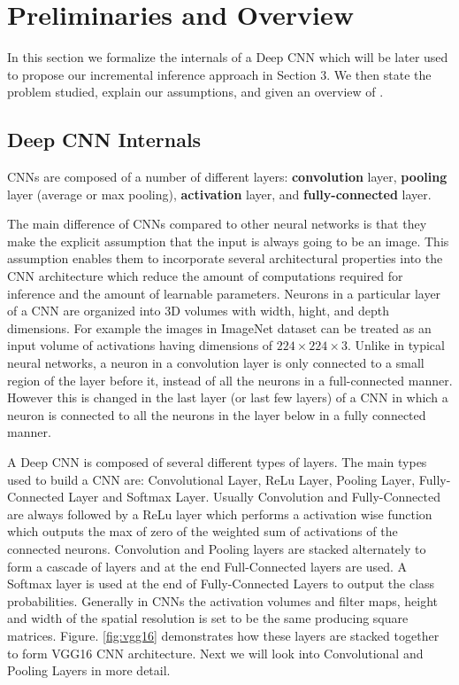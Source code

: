 \section{Preliminaries and Overview}
In this section we formalize the internals of a Deep CNN which will be later used to propose our incremental inference approach in Section 3. We then state the problem studied, explain our assumptions, and given an overview of \system.

\subsection{Deep CNN Internals}
CNNs are composed of a number of different layers: \textbf{convolution} layer, \textbf{pooling} layer (average or max pooling), \textbf{activation} layer, and \textbf{fully-connected} layer.

The main difference of CNNs compared to other neural networks is that they make the explicit assumption that the input is always going to be an image.
This assumption enables them to incorporate several architectural properties into the CNN architecture which reduce the amount of computations required for inference and the amount of learnable parameters.
Neurons in a particular layer of a CNN are organized into 3D volumes with width, hight, and depth dimensions.
For example the images in ImageNet dataset can be treated as an input volume of activations having dimensions of $224\times224\times3$.
Unlike in typical neural networks, a neuron in a convolution layer is only connected to a small region of the layer before it, instead of all the neurons in a full-connected manner.
However this is changed in the last layer (or last few layers) of a CNN in which a neuron is connected to all the neurons in the layer below in a fully connected manner. 

A Deep CNN is composed of several different types of layers. The main types used to build a CNN are: Convolutional Layer, ReLu Layer, Pooling Layer, Fully-Connected Layer and Softmax Layer. Usually Convolution and Fully-Connected are always followed by a ReLu layer which performs a activation wise function which outputs the max of zero of the weighted sum of activations of the connected neurons. Convolution and Pooling layers are stacked alternately to form a cascade of layers and at the end Full-Connected layers are used. A Softmax layer is used at the end of Fully-Connected Layers to output the class probabilities.
Generally in CNNs the activation volumes and filter maps, height and width of the spatial resolution is set to be the same producing square matrices.
Figure. \ref{fig:vgg16} demonstrates how these layers are stacked together to form VGG16 CNN architecture.
Next we will look into Convolutional and Pooling Layers in more detail.

